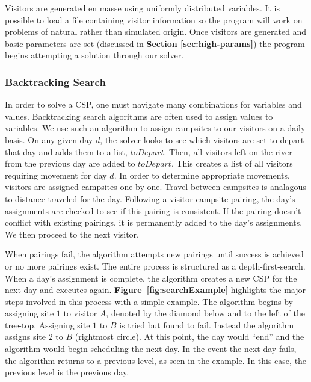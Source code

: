\documentclass[11pt]{article} %
\begin{document}
Visitors are generated en masse using uniformly distributed
variables.  It is possible to load a file containing visitor information
so the program will work on problems of natural rather than simulated
origin.  Once visitors are generated and basic parameters
are set (discussed in \textbf{Section \ref{sec:high-params}}) the program begins
attempting a solution through our solver.

\subsubsection{Backtracking Search}
In order to solve a CSP, one must navigate many combinations
for variables and values. Backtracking search algorithms are often used
to assign values to variables\cite{AI-Intro}.  We use such an algorithm to
assign campsites to our  visitors on a daily basis.
On any given day
$d$, the solver looks to see which visitors are set to depart that day and
adds them to a list, $toDepart$.  Then, all visitors left on the
river from the previous day are added to $toDepart$.  This creates a list of all
 visitors requiring movement for day $d$.  In order to determine
appropriate movements, visitors are assigned campsites one-by-one.  Travel
between campsites is analagous to
distance traveled for the day.  Following
a visitor-campsite pairing, the day's assignments are checked to see if this pairing is
consistent.  If the pairing doesn't conflict with
existing pairings, it is permanently added to the day's assignments.
We then proceed to the next visitor.

When pairings fail, the algorithm attempts new pairings
until success is achieved or no more pairings exist. The entire process is 
structured as a
depth-first-search. When a day's assignment is complete, the algorithm creates
a new CSP for the next day and executes again.  \textbf{Figure~\ref{fig:searchExample}}
highlights the major steps
involved in this process with a simple example.  The algorithm begins by
assigning site $1$ to visitor $A$, denoted
by the diamond below and to the left of the tree-top.  Assigning
site $1$ to $B$ is tried but found to fail.  Instead the algorithm assigns site
$2$ to $B$ (rightmost circle).  At this point, the day would ``end'' and
the algorithm would begin scheduling the next day.  In the event
the next day fails, the algorithm returns to a previous level, as
seen in the example.  In this case, the previous level is the previous day.
\end{document}
